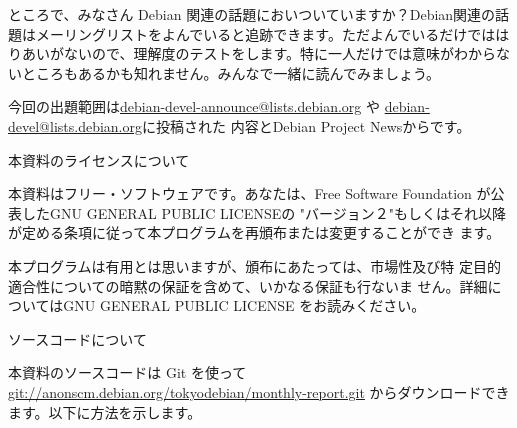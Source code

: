 \documentclass[mingoth,a4paper]{jsarticle}
\begin{document}
ところで、みなさん Debian 関連の話題においついていますか？Debian関連の話
題はメーリングリストをよんでいると追跡できます。ただよんでいるだけではは
りあいがないので、理解度のテストをします。特に一人だけでは意味がわからな
いところもあるかも知れません。みんなで一緒に読んでみましょう。

今回の出題範囲は\url{debian-devel-announce@lists.debian.org} や \url{debian-devel@lists.debian.org}に投稿された
内容とDebian Project Newsからです。

\small
\begin{multicols}{2}

\end{multicols}
\normalsize


\newpage

\begin{center}
本資料のライセンスについて
\end{center}

\begin{fontsize}{6}{6}

本資料はフリー・ソフトウェアです。あなたは、Free Software
Foundation が公表したGNU GENERAL PUBLIC LICENSEの "バージョン２"もしくはそれ以降
が定める条項に従って本プログラムを再頒布または変更することができ
ます。

本プログラムは有用とは思いますが、頒布にあたっては、市場性及び特
定目的適合性についての暗黙の保証を含めて、いかなる保証も行ないま
せん。詳細についてはGNU GENERAL PUBLIC LICENSE をお読みください。

\end{fontsize}

\begin{center}
ソースコードについて
\end{center}

本資料のソースコードは Git を使って\url{git://anonscm.debian.org/tokyodebian/monthly-report.git}
からダウンロードできます。以下に方法を示します。

\end{document}
